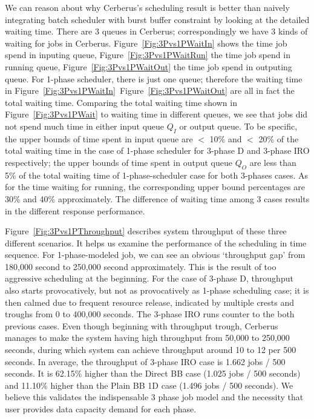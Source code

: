 We can reason about why Cerberus's scheduling result is better than
naively integrating batch scheduler with burst buffer constraint
by looking at the detailed waiting time.
There are 3 queues in Cerberus;
correspondingly we have 3 kinds of waiting for jobs in Cerberus.
Figure~\ref{Fig:3Pvs1PWaitIn} shows the time job spend in inputing queue,
Figure~\ref{Fig:3Pvs1PWaitRun} the time job spend in running queue,
Figure~\ref{Fig:3Pvs1PWaitOut} the time job spend in outputing queue.
For 1-phase scheduler, there is just one queue;
therefore the waiting time in Figure~\ref{Fig:3Pvs1PWaitIn}~Figure~\ref{Fig:3Pvs1PWaitOut}
are all in fact the total waiting time.
Comparing the total waiting time shown in Figure~\ref{Fig:3Pvs1PWait}
to waiting time in different queues,
we see that jobs did not spend much time in either input queue $Q_I$ or output queue.
To be specific, the upper bounds of time spent in input queue are
$<$ 10\% and $<$ 20\% of the total waiting time in the case of 1-phase scheduler
for 3-phase D and 3-phase IRO respectively;
the upper bounds of time spent in output queue $Q_O$ are
less than 5\% of the total waiting time of 1-phase-scheduler case
for both 3-phases cases.
As for the time waiting for running, the corresponding upper bound percentages
are 30\% and 40\% approximately.
The difference of waiting time among 3 cases results in the different
response performance.


Figure~\ref{Fig:3Pvs1PThroughput} describes system throughput of these three different scenarios.
It helps us examine the performance of the scheduling in time sequence.
For 1-phase-modeled job, we can see an obvious `throughput gap'
from 180,000 second to 250,000 second approximately.
This is the result of too aggressive scheduling at the beginning.
For the case of 3-phase D, throughput also starts provocatively,
but not as provocatively as 1-phase scheduling case;
it is then calmed due to frequent resource release,
indicated by multiple crests and troughs from 0 to 400,000 seconds.
The 3-phase IRO runs counter to the both previous cases.
Even though beginning with throughput trough,
Cerberus manages to make the system having high throughput from 50,000 to 250,000 seconds,
during which system can achieve throughput around 10 to 12 per 500 seconds. 
In average, the throughput of 3-phase IRO case is 1.662 jobs / 500 seconds.
It is 62.15\% higher than the Direct BB case (1.025 jobs / 500 seconds) and
11.10\% higher than the Plain BB 1D case (1.496 jobs / 500 seconds).
We believe this validates the indispensable 3 phase job model and
the necessity that user provides data capacity demand for each phase.


